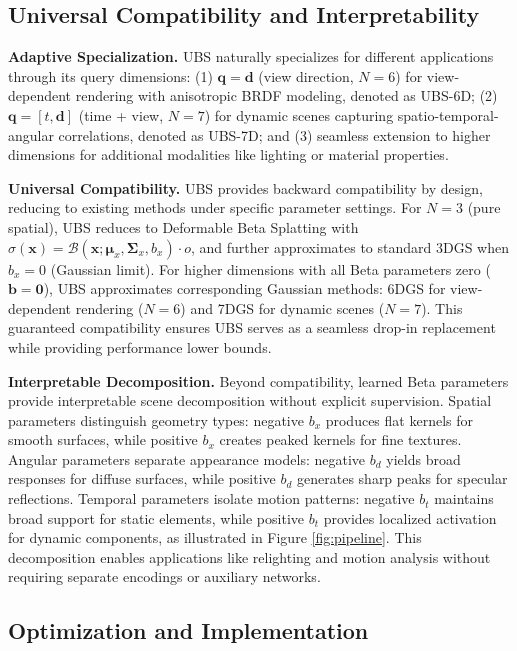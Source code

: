 \documentclass{article} %
\begin{document}
\subsection{Universal Compatibility and Interpretability}
\label{sec:method_universal_compatibility}

\textbf{Adaptive Specialization.} UBS naturally specializes for different applications through its query dimensions: (1) $\bm{q} = \bm{d}$ (view direction, $N=6$) for view-dependent rendering with anisotropic BRDF modeling, denoted as UBS-6D; (2) $\bm{q} = [t, \bm{d}]$ (time + view, $N=7$) for dynamic scenes capturing spatio-temporal-angular correlations, denoted as UBS-7D; and (3) seamless extension to higher dimensions for additional modalities like lighting or material properties.

\textbf{Universal Compatibility.} UBS provides backward compatibility by design, reducing to existing methods under specific parameter settings. For $N=3$ (pure spatial), UBS reduces to Deformable Beta Splatting with $\sigma(\bm{x}) = \mathcal{B}(\bm{x}; \bm{\mu}_x, \bm{\Sigma}_x, b_x) \cdot o$, and further approximates to standard 3DGS when $b_x = 0$ (Gaussian limit). For higher dimensions with all Beta parameters zero ($\bm{b} = \bm{0}$), UBS approximates corresponding Gaussian methods: 6DGS for view-dependent rendering ($N=6$) and 7DGS for dynamic scenes ($N=7$). This guaranteed compatibility ensures UBS serves as a seamless drop-in replacement while providing performance lower bounds.

\textbf{Interpretable Decomposition.} Beyond compatibility, learned Beta parameters provide interpretable scene decomposition without explicit supervision. Spatial parameters distinguish geometry types: negative $b_x$ produces flat kernels for smooth surfaces, while positive $b_x$ creates peaked kernels for fine textures. Angular parameters separate appearance models: negative $b_d$ yields broad responses for diffuse surfaces, while positive $b_d$ generates sharp peaks for specular reflections. Temporal parameters isolate motion patterns: negative $b_t$ maintains broad support for static elements, while positive $b_t$ provides localized activation for dynamic components, as illustrated in Figure \ref{fig:pipeline}. This decomposition enables applications like relighting and motion analysis without requiring separate encodings or auxiliary networks.

\subsection{Optimization and Implementation}
\end{document}
